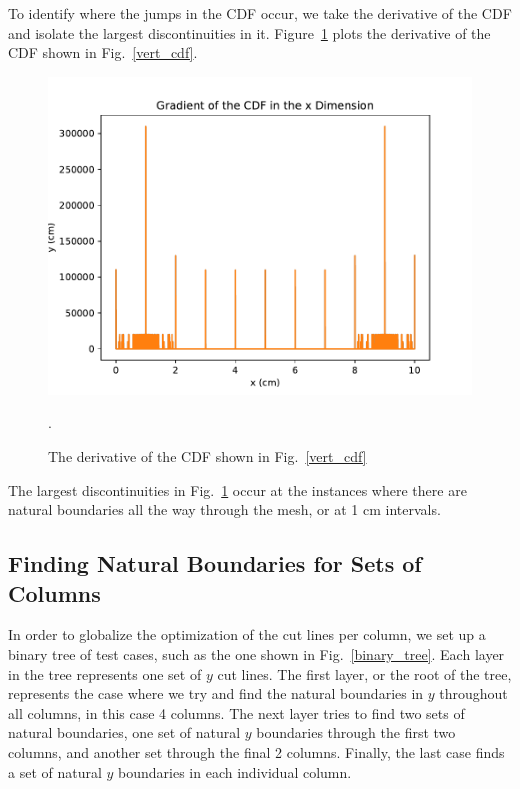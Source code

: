 To identify where the jumps in the CDF occur, we take the derivative of the CDF and isolate the largest discontinuities in it. Figure~\ref{gradcdf} plots the derivative of the CDF shown in Fig.~\ref{vert_cdf}. 
\begin{figure}[h]
\centering
\includegraphics[scale=0.75]{../figures/gradcdf.pdf}
\caption{The derivative of the CDF shown in Fig.~\ref{vert_cdf}}.
\label{gradcdf}
\end{figure}
The largest discontinuities in Fig.~\ref{gradcdf} occur at the instances where there are natural boundaries all the way through the mesh, or at 1 cm intervals.

\FloatBarrier
\subsection{Finding Natural Boundaries for Sets of Columns}
In order to globalize the optimization of the cut lines per column, we set up a binary tree of test cases, such as the one shown in Fig.~\ref{binary_tree}. Each layer in the tree represents one set of $y$ cut lines. The first layer, or the root of the tree, represents the case where we try and find the natural boundaries in $y$ throughout all columns, in this case 4 columns. The next layer tries to find two sets of natural boundaries, one set of natural $y$ boundaries through the first two columns, and another set through the final 2 columns. Finally, the last case finds a set of natural $y$ boundaries in each individual column.

